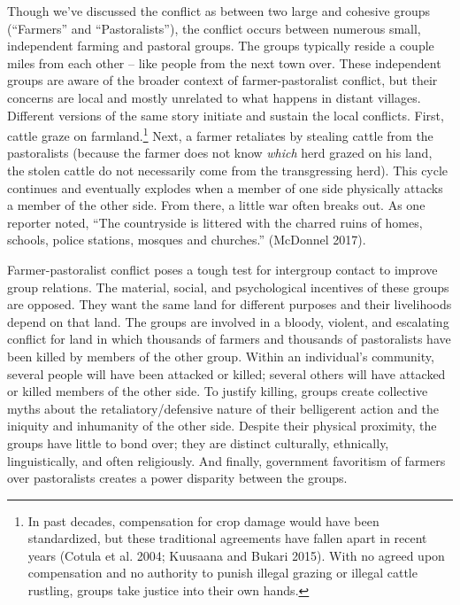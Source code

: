 \documentclass[11pt]{article}
\begin{document}
Though we've discussed the conflict as between two large and cohesive
groups (``Farmers'' and ``Pastoralists''), the conflict occurs between
numerous small, independent farming and pastoral groups. The groups
typically reside a couple miles from each other -- like people from the
next town over. These independent groups are aware of the broader
context of farmer-pastoralist conflict, but their concerns are local and
mostly unrelated to what happens in distant villages. Different versions
of the same story initiate and sustain the local conflicts. First,
cattle graze on farmland.\footnote{In past decades, compensation for
  crop damage would have been standardized, but these traditional
  agreements have fallen apart in recent years (Cotula et al. 2004;
  Kuusaana and Bukari 2015). With no agreed upon compensation and no
  authority to punish illegal grazing or illegal cattle rustling, groups
  take justice into their own hands.} Next, a farmer retaliates by
stealing cattle from the pastoralists (because the farmer does not know
\emph{which} herd grazed on his land, the stolen cattle do not
necessarily come from the transgressing herd). This cycle continues and
eventually explodes when a member of one side physically attacks a
member of the other side. From there, a little war often breaks out. As
one reporter noted, ``The countryside is littered with the charred ruins
of homes, schools, police stations, mosques and churches.'' (McDonnel
2017).

Farmer-pastoralist conflict poses a tough test for intergroup contact to
improve group relations. The material, social, and psychological
incentives of these groups are opposed. They want the same land for
different purposes and their livelihoods depend on that land. The groups
are involved in a bloody, violent, and escalating conflict for land in
which thousands of farmers and thousands of pastoralists have been
killed by members of the other group. Within an individual's community,
several people will have been attacked or killed; several others will
have attacked or killed members of the other side. To justify killing,
groups create collective myths about the retaliatory/defensive nature of
their belligerent action and the iniquity and inhumanity of the other
side. Despite their physical proximity, the groups have little to bond
over; they are distinct culturally, ethnically, linguistically, and
often religiously. And finally, government favoritism of farmers over
pastoralists creates a power disparity between the groups.
\end{document}
